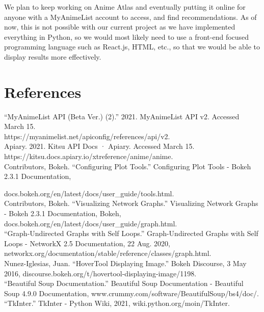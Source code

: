\documentclass[fontsize=11pt]{article}
\begin{document}
\item[]We plan to keep working on Anime Atlas and eventually putting it online for anyone with a MyAnimeList account to access, and find recommendations. As of now, this is not possible with our current project as we have implemented everything in Python, so we would most likely need to use a front-end focused programming language such as React.js, HTML, etc., so that we would be able to display results more effectively. 




\newpage

\section*{References} 

“MyAnimeList API (Beta Ver.) (2).” 2021. MyAnimeList API v2. Accessed March 15. \\ https://myanimelist.net/apiconfig/references/api/v2. \\

Apiary. 2021. Kitsu API Docs · Apiary. Accessed March 15. https://kitsu.docs.apiary.io/xtreference/anime/anime. \\

Contributors, Bokeh. “Configuring Plot Tools.” Configuring Plot Tools - Bokeh 2.3.1 Documentation,

docs.bokeh.org/en/latest/docs/user\_guide/tools.html. \\

Contributors, Bokeh. “Visualizing Network Graphs.” Visualizing Network Graphs - Bokeh 2.3.1 Documentation, Bokeh, docs.bokeh.org/en/latest/docs/user\_guide/graph.html. \\

“Graph-Undirected Graphs with Self Loops.” Graph-Undirected Graphs with Self Loops - NetworkX 2.5 Documentation, 22 Aug. 2020, networkx.org/documentation/stable/reference/classes/graph.html. \\

Nunez-Iglesias, Juan. “HoverTool Displaying Image.” Bokeh Discourse, 3 May 2016, discourse.bokeh.org/t/hovertool-displaying-image/1198. \\


“Beautiful Soup Documentation.” Beautiful Soup Documentation - Beautiful Soup 4.9.0 Documentation, www.crummy.com/software/BeautifulSoup/bs4/doc/. \\

“TkInter.” TkInter - Python Wiki, 2021, wiki.python.org/moin/TkInter. \\
\end{document}
